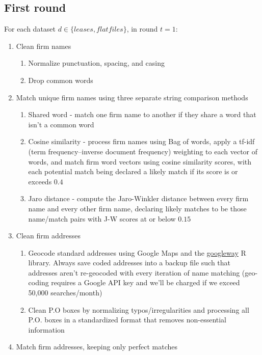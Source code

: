 \documentclass{article}
\begin{document}
\subsection{First round}
For each dataset $d \in \{leases, flatfiles\}$, in round $t =  1$:
\begin{enumerate}
    \item Clean firm names 
    \begin{enumerate}
    \item Normalize punctuation, spacing, and casing
    \item Drop common words
    \end{enumerate}
    
    \item Match unique firm names using three separate string comparison methods
     \begin{enumerate}
    \item Shared word - match one firm name to another if they share a word that isn't a common word
    \item Cosine similarity - process firm names using Bag of words, apply a tf-idf (term frequency–inverse document frequency) weighting to each vector of words, and match firm word vectors using cosine similarity scores, with each potential match being declared a likely match if its score is or exceeds $0.4$ 
     \item Jaro distance - compute the Jaro-Winkler distance between every firm name and every other firm name, declaring likely matches to be those name/match pairs with J-W scores at or below $0.15$
    \end{enumerate}
    
    \item Clean firm addresses 
    \begin{enumerate}
    \item Geocode standard addresses using Google Maps and the \href{https://cran.r-project.org/web/packages/googleway/googleway.pdf}{googleway} R library. Always save coded addresses into a backup file such that addresses aren't re-geocoded with every iteration of name matching (geo-coding requires a Google API key and we'll be charged if we exceed 50,000 searches/month) 
    \item Clean P.O boxes by normalizing typos/irregularities and processing all P.O. boxes in a standardized format that removes non-essential information
    \end{enumerate}
    
    \item Match firm addresses, keeping only perfect matches


\end{enumerate}
\end{document}
